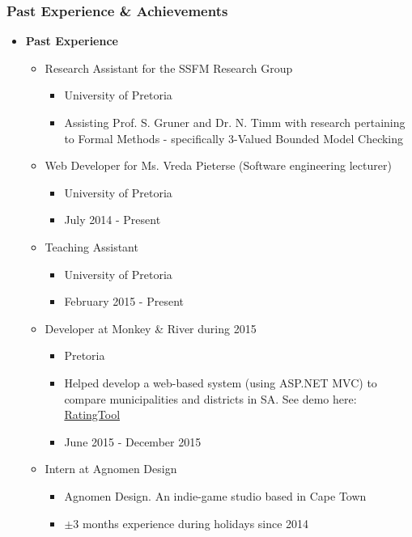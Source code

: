 \documentclass{article}
\begin{document}
	\subsubsection{Past Experience \& Achievements}
	\begin{itemize}
		\item \textbf{Past Experience}
		\begin{itemize}
			\item Research Assistant for the SSFM Research Group
			\begin{itemize}
				\item University of Pretoria
				\item Assisting Prof. S. Gruner and Dr. N. Timm with research pertaining to Formal Methods - specifically 3-Valued Bounded Model Checking
			\end{itemize}
			\item Web Developer for Ms. Vreda Pieterse (Software engineering lecturer)
			\begin{itemize}
				\item University of Pretoria
				\item July 2014 - Present
			\end{itemize}
			\item Teaching Assistant
			\begin{itemize}
				\item University of Pretoria
				\item February 2015 - Present
			\end{itemize}
			
			\item Developer at Monkey \& River during 2015
			\begin{itemize}
				\item Pretoria
				\item Helped develop a web-based system (using ASP.NET MVC) to compare municipalities and districts in SA. See demo here: \href{http://salgabarometerdemo.org.za/RatingTool}{RatingTool}
				\item June 2015 - December 2015
			\end{itemize}
			
			\item Intern at Agnomen Design
			\begin{itemize}
				\item Agnomen Design. An indie-game studio based in Cape Town
				\item $ \pm 3 $ months experience during holidays since 2014
			\end{itemize}
		\end{itemize}
		

\end{itemize}
\end{document}
